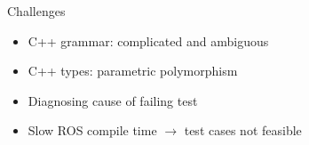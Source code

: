 \documentclass[final]{beamer}
\newlength{\onecolwid}
\begin{document}
\begin{frame}[t]
\begin{columns}[t]
\begin{column}{\onecolwid}

\begin{block}{Challenges}
\begin{itemize}
\item C++ grammar: complicated and ambiguous
\item C++ types: parametric polymorphism
\item Diagnosing cause of failing test
\item Slow ROS compile time $\to$ test cases not feasible
\end{itemize}

\end{block}




\end{column}
\end{columns}
\end{frame}
\end{document}
